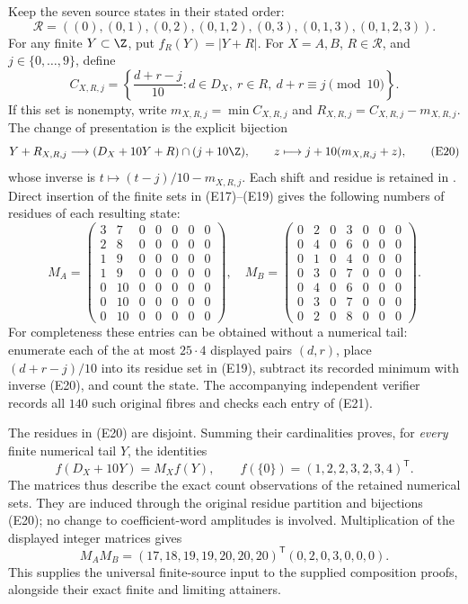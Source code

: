 Keep the seven source states in their stated order:
\[
 \mathcal R=((0),(0,1),(0,2),(0,1,2),(0,3),(0,1,3),(0,1,2,3)).
 \tag{E18}
\]
For any finite \(Y\subset\Z\), put \(f_R(Y)=|Y+R|\).  For
\(X=A,B\), \(R\in\mathcal R\), and \(j\in\{0,\ldots,9\}\), define
\[
 C_{X,R,j}
  =\left\{\frac{d+r-j}{10}:
        d\in D_X,\ r\in R,\ d+r\equiv j\pmod {10}\right\}.
 \tag{E19}
\]
If this set is nonempty, write \(m_{X,R,j}=\min C_{X,R,j}\) and
\(R_{X,R,j}=C_{X,R,j}-m_{X,R,j}\).
The change of presentation is the explicit bijection
\[
 Y+R_{X,R,j}\longrightarrow
 (D_X+10Y+R)\cap(j+10\Z),\qquad
 z\longmapsto j+10(m_{X,R,j}+z),
 \tag{E20}
\]
whose inverse is \(t\mapsto(t-j)/10-m_{X,R,j}\).  Each shift and
residue is retained in .
Direct insertion of the finite sets in (E17)--(E19) gives the following
numbers of residues of each resulting state:
\[
 M_A=\begin{pmatrix}
3&7&0&0&0&0&0\\2&8&0&0&0&0&0\\1&9&0&0&0&0&0\\
1&9&0&0&0&0&0\\0&10&0&0&0&0&0\\0&10&0&0&0&0&0\\
0&10&0&0&0&0&0
\end{pmatrix},
\quad
 M_B=\begin{pmatrix}
0&2&0&3&0&0&0\\0&4&0&6&0&0&0\\0&1&0&4&0&0&0\\
0&3&0&7&0&0&0\\0&4&0&6&0&0&0\\0&3&0&7&0&0&0\\
0&2&0&8&0&0&0
\end{pmatrix}.
 \tag{E21}
\]
For completeness these entries can be obtained without a numerical tail:
enumerate each of the at most \(25\cdot4\) displayed pairs \((d,r)\),
place \((d+r-j)/10\) into its residue set in (E19), subtract its recorded
minimum with inverse (E20), and count the state.  The accompanying
independent verifier records all \(140\) such original fibres and
checks each entry of (E21).

The residues in (E20) are disjoint.  Summing their cardinalities proves,
for \emph{every} finite numerical tail \(Y\), the identities
\[
 f(D_X+10Y)=M_Xf(Y),\qquad
 f(\{0\})=(1,2,2,3,2,3,4)^{\mathsf T}.
 \tag{E22}
\]
The matrices thus describe the exact count observations of the retained
numerical sets.  They are induced through the original residue partition
and bijections (E20); no change to coefficient-word amplitudes is involved.
Multiplication of the displayed integer matrices gives
\[
 M_AM_B=(17,18,19,19,20,20,20)^{\mathsf T}(0,2,0,3,0,0,0).
 \tag{E23}
\]
This supplies the universal finite-source input to the supplied
composition proofs, alongside their exact finite and limiting attainers.

